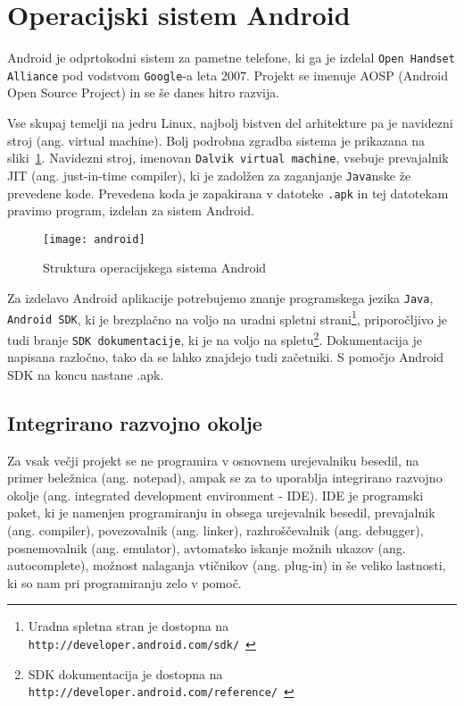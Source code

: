 \documentclass[a4paper, 12pt]{book}
\begin{document}
\section{Operacijski sistem Android}
Android je odprtokodni sistem za pametne telefone, ki ga je izdelal {\tt Open Handset Alliance} pod vodstvom {\tt Google}-a leta 2007. Projekt se imenuje AOSP (Android Open Source Project) in se še danes hitro razvija.

Vse skupaj temelji na jedru Linux, najbolj bistven del arhitekture pa je navidezni stroj (ang. virtual machine). Bolj podrobna zgradba sistema je prikazana na sliki~\ref{picAndroid}. Navidezni stroj, imenovan {\tt Dalvik virtual machine}, vsebuje prevajalnik JIT (ang. just-in-time compiler), ki je zadolžen za zaganjanje {\tt Java}nske že prevedene kode. Prevedena koda je zapakirana v datoteke {\tt .apk} in tej datotekam pravimo program, izdelan za sistem Android.

\begin{figure}[h]
	\centering
	\texttt{[image: android]}
	\caption{Struktura operacijskega sistema Android~\cite{bibAndroidWiki}}
	\label{picAndroid}
\end{figure}
\clearpage

Za izdelavo Android aplikacije potrebujemo znanje programskega jezika {\tt Java}, {\tt Android SDK}, ki je brezplačno na voljo na uradni spletni strani\footnote{Uradna spletna stran je dostopna na {\tt http://developer.android.com/sdk/}~\cite{bibAndroid}}, priporočljivo je tudi branje {\tt SDK dokumentacije}, ki je na voljo na spletu\footnote{SDK dokumentacija je dostopna na {\tt http://developer.android.com/reference/}~\cite{bibAndroid}}. Dokumentacija je napisana razločno, tako da se lahko znajdejo tudi začetniki. S pomočjo Android SDK na koncu nastane .apk.

\subsection{Integrirano razvojno okolje} 
Za vsak večji projekt se ne programira v osnovnem urejevalniku besedil, na primer beležnica (ang. notepad), ampak se za to uporablja integrirano razvojno okolje (ang. integrated development environment - IDE). IDE je programski paket, ki je namenjen programiranju  in obsega urejevalnik besedil, prevajalnik (ang. compiler), povezovalnik (ang. linker), razhroščevalnik (ang. debugger), posnemovalnik (ang. emulator), avtomatsko iskanje možnih ukazov (ang. autocomplete), možnost nalaganja vtičnikov (ang. plug-in) in še veliko lastnosti, ki so nam pri programiranju zelo v pomoč. 
\end{document}
